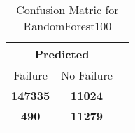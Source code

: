 \begin{table}[] 
\caption{Confusion Matric for RandomForest100} 
\label{Table: Prediction Accuracy-NoneRandomForest100DecisionTrees100EKF-ignoreReflection100.9EKF-top2-Reflection} 
\centering 
\begin{tabular} 
 {@{}ccc@{}} 
\toprule 
\multicolumn{2}{c}{\textbf{Predicted}}
 \\ \midrule 
\multicolumn{1}{|c|}{Failure} & 
\multicolumn{1}{c|}{No Failure}
 \\ \midrule 
\multicolumn{1}{|c|}{\color{green}\textbf{147335}} & 
\multicolumn{1}{c|}{\color{red}\textbf{11024}}
 \\ \midrule 
\multicolumn{1}{|c|}{\color{red}\textbf{490}} & 
\multicolumn{1}{c|}{\color{green}\textbf{11279}}
 \\ \bottomrule 
\end{tabular} 
\end{table} 
